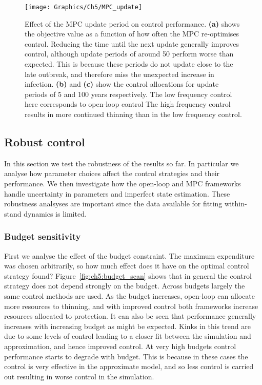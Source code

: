 \begin{figure}
    \begin{center}
        \texttt{[image: Graphics/Ch5/MPC\_update]}
        \caption[Effect of MPC update period]{Effect of the MPC update period on control performance. \textbf{(a)} shows the objective value as a function of how often the MPC re-optimises control. Reducing the time until the next update generally improves control, although update periods of around \SI{50}{\years} perform worse than expected. This is because these periods do not update close to the late outbreak, and therefore miss the unexpected increase in infection. \textbf{(b)} and \textbf{(c)} show the control allocations for update periods of 5 and 100 years respectively. The low frequency control here corresponds to open-loop control The high frequency control results in more continued thinning than in the low frequency control.\label{fig:ch5:mpc_update}}
    \end{center}
\end{figure}

\subsection{Robust control}

In this section we test the robustness of the results so far. In particular we analyse how parameter choices affect the control strategies and their performance. We then investigate how the open-loop and MPC frameworks handle uncertainty in parameters and imperfect state estimation. These robustness analsyses are important since the data available for fitting within-stand dynamics is limited.

\subsubsection{Budget sensitivity}

First we analyse the effect of the budget constraint. The maximum expenditure was chosen arbitrarily, so how much effect does it have on the optimal control strategy found? Figure~\ref{fig:ch5:budget_scan} shows that in general the control strategy does not depend strongly on the budget. Across budgets largely the same control methods are used. As the budget increases, open-loop can allocate more resources to thinning, and with improved control both frameworks increase resources allocated to protection. It can also be seen that performance generally increases with increasing budget as might be expected. Kinks in this trend are due to some levels of control leading to a closer fit between the simulation and approximation, and hence improved control. At very high budgets control performance starts to degrade with budget. This is because in these cases the control is very effective in the approximate model, and so less control is carried out resulting in worse control in the simulation.

